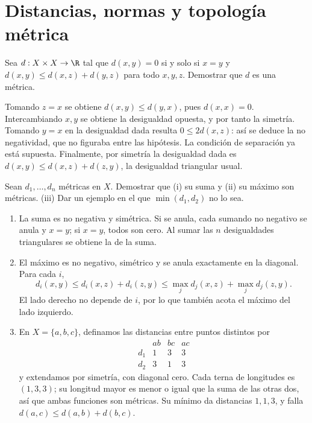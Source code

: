 
\chapter{Distancias, normas y topología métrica}

\begin{ejercicio}\label{ej:lectura-1-1}
Sea $d:X\times X\to\R$ tal que $d(x,y)=0$ si y solo si $x=y$ y $d(x,y)\le d(x,z)+d(y,z)$ para todo $x,y,z$. Demostrar que $d$ es una métrica.
\end{ejercicio}
\begin{solucion}
Tomando $z=x$ se obtiene $d(x,y)\le d(y,x)$, pues $d(x,x)=0$. Intercambiando $x,y$ se obtiene la desigualdad opuesta, y por tanto la simetría. Tomando $y=x$ en la desigualdad dada resulta $0\le2d(x,z)$: así se deduce la no negatividad, que no figuraba entre las hipótesis. La condición de separación ya está supuesta. Finalmente, por simetría la desigualdad dada es $d(x,y)\le d(x,z)+d(z,y)$, la desigualdad triangular usual.
\end{solucion}

\begin{ejercicio}\label{ej:lectura-1-2}
Sean $d_1,\ldots,d_n$ métricas en $X$. Demostrar que (i) su suma y (ii) su máximo son métricas. (iii) Dar un ejemplo en el que $\min(d_1,d_2)$ no lo sea.
\end{ejercicio}
\begin{solucion}
\begin{enumerate}[label=(\roman*)]
\item La suma es no negativa y simétrica. Si se anula, cada sumando no negativo se anula y $x=y$; si $x=y$, todos son cero. Al sumar las $n$ desigualdades triangulares se obtiene la de la suma.
\item El máximo es no negativo, simétrico y se anula exactamente en la diagonal. Para cada $i$,
\[
d_i(x,y)\le d_i(x,z)+d_i(z,y)\le \max_j d_j(x,z)+\max_jd_j(z,y).
\]
El lado derecho no depende de $i$, por lo que también acota el máximo del lado izquierdo.
\item En $X=\{a,b,c\}$, definamos las distancias entre puntos distintos por
\[
\begin{array}{c|ccc}
&ab&bc&ac\\\hline
d_1&1&3&3\\
d_2&3&1&3
\end{array}
\]
y extendamos por simetría, con diagonal cero. Cada terna de longitudes es $(1,3,3)$; su longitud mayor es menor o igual que la suma de las otras dos, así que ambas funciones son métricas. Su mínimo da distancias $1,1,3$, y falla $d(a,c)\le d(a,b)+d(b,c)$.
\end{enumerate}
\end{solucion}

